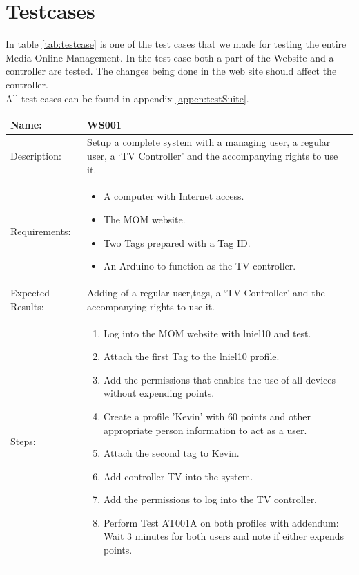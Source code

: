 \section{Testcases}
\label{sec:testcase}
In table \ref{tab:testcase} is one of the test cases that we made for testing the entire Media-Online Management. In the test case both a part of the Website and a controller are tested. The changes being done in the web site should affect the controller.\\ 
 All test cases can be found in appendix \vref{appen:testSuite}.
\begin{table}[h]
	\centering
		\begin{tabular*}{\textwidth}{|l|l|}
		\hline
		\hline
		Name: & WS001\\
		\hline
		Description: & \parbox{0.70\textwidth}{Setup a complete system with a managing user, a regular user, a `TV Controller' and the accompanying rights to use it.}\\
		\hline
		Requirements: & \parbox{0.70\textwidth}{
		\begin{itemize}
			\item A computer with Internet access.
			\item The MOM website.
			\item Two Tags prepared with a Tag ID.
			\item An Arduino to function as the TV controller. 
		\end{itemize}}
		\\
		\hline
		Expected Results: & \parbox{.70\textwidth}{Adding of a regular user,tags, a `TV Controller' and the accompanying rights to use it.}\\
		\hline
		Steps: & \parbox{.70\textwidth}{
		\begin{enumerate}
			\item Log into the MOM website with lniel10 and test.
			\item Attach the first Tag to the lniel10 profile.
			\item Add the permissions that enables the use of all devices without expending points.
			\item Create a profile 'Kevin' with 60 points and other appropriate person information to act as a user.
			\item Attach the second tag to Kevin.
			\item Add controller TV into the system.
			\item Add the permissions to log into the TV controller.
			\item Perform Test AT001A on both profiles with addendum: Wait 3 minutes for both users and note if either expends points.
		\end{enumerate}}
		\\		
		\hline
		\end{tabular*}
\end{table}


